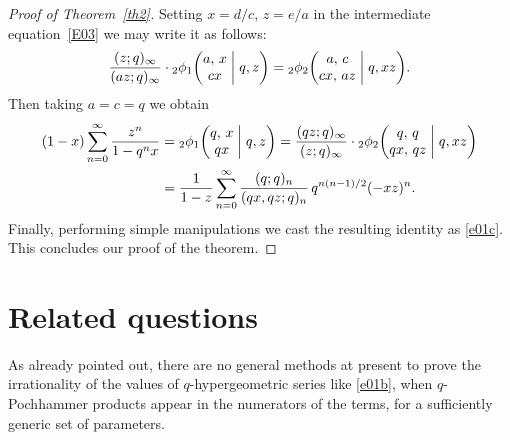 \documentclass[12pt,reqno]{amsart}
\theoremstyle{remark}
\begin{document}
\begin{proof}[Proof of Theorem~\textup{\ref{th2}}]
Setting $x=d/c$, $z=e/a$ in the intermediate equation~\eqref{E03} we may write it as follows:
$$
\frac{(z;q)_\infty}{(az;q)_\infty}
\cdot{}_2\phi_1\biggl(\begin{matrix} a, \, x \\ cx \end{matrix} \biggm|q,z\biggr)
={}_2\phi_2\biggl(\begin{matrix} a, \, c \\ cx, \, az \end{matrix} \biggm|q,xz\biggr).
$$
Then taking $a=c=q$ we obtain
\begin{align*}
(1-x)\sum_{n=0}^\infty\frac{z^n}{1-q^nx}
&={}_2\phi_1\biggl(\begin{matrix} q, \, x \\ qx \end{matrix} \biggm|q,z\biggr)
=\frac{(qz;q)_\infty}{(z;q)_\infty}
\cdot{}_2\phi_2\biggl(\begin{matrix} q, \, q \\ qx, \, qz \end{matrix} \biggm|q,xz\biggr)
\\
&=\frac1{1-z}\sum_{n=0}^\infty
\frac{(q;q)_n}{(qx,qz;q)_n}\,q^{n(n-1)/2}(-xz)^n.
\end{align*}
Finally, performing simple manipulations we cast the resulting identity as \eqref{e01c}. This concludes our proof of the theorem.
\end{proof}

\section{Related questions}
\label{sfin}

As already pointed out, there are no general methods at present to prove the irrationality of the values of $q$-hypergeometric series
like \eqref{e01b}, when $q$-Pochhammer products appear in the numerators of the terms, for a sufficiently generic set of parameters.
\end{document}
